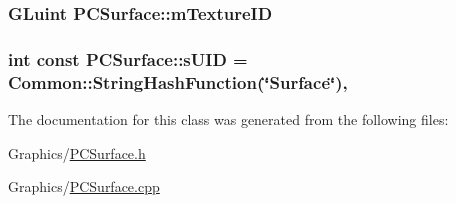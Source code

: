 \subsubsection[{\texorpdfstring{m\+Texture\+ID}{mTextureID}}]{\setlength{\rightskip}{0pt plus 5cm}G\+Luint P\+C\+Surface\+::m\+Texture\+ID\hspace{0.3cm}{\ttfamily [private]}}\hypertarget{classPCSurface_aabc8986049dd19fee4fc8925d140ab9a}{}\label{classPCSurface_aabc8986049dd19fee4fc8925d140ab9a}
\subsubsection[{\texorpdfstring{s\+U\+ID}{sUID}}]{\setlength{\rightskip}{0pt plus 5cm}int const P\+C\+Surface\+::s\+U\+ID = {\bf Common\+::\+String\+Hash\+Function}(\char`\"{}Surface\char`\"{})\hspace{0.3cm}{\ttfamily [static]}, {\ttfamily [private]}}\hypertarget{classPCSurface_a865bdb0c656fe7247527f184a02239d8}{}\label{classPCSurface_a865bdb0c656fe7247527f184a02239d8}


The documentation for this class was generated from the following files\+:\begin{DoxyCompactItemize}
\item 
Graphics/\hyperlink{PCSurface_8h}{P\+C\+Surface.\+h}\item 
Graphics/\hyperlink{PCSurface_8cpp}{P\+C\+Surface.\+cpp}\end{DoxyCompactItemize}
